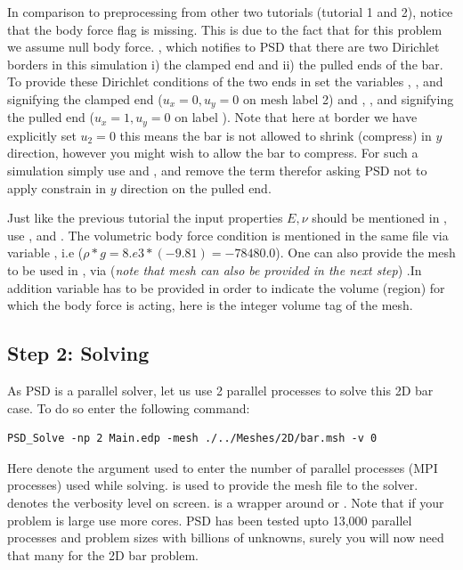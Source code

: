 In comparison to preprocessing from other two tutorials (tutorial 1 and
2), notice that the body force flag  is
missing. This is due to the fact that for this problem we assume null
body force. , which notifies to PSD that
there are two Dirichlet borders in this simulation i) the clamped end
and ii) the pulled ends of the bar. To provide these Dirichlet
conditions of the two ends in  set the
variables , , and 
signifying the clamped end (\(u_x=0,u_y=0\) on mesh label 2) and
, , and  signifying the
pulled end (\(u_x=1,u_y=0\) on label ). Note that here at border
 we have explicitly set \(u_2=0\) this means the bar is not
allowed to shrink (compress) in \(y\) direction, however you might wish
to allow the bar to compress. For such a simulation simply use
 and , and remove the term 
therefor asking PSD not to apply constrain in \(y\) direction on the
pulled end.

Just like the previous tutorial the input properties \(E,\nu\) should be
mentioned in , use , and
. The volumetric body force condition is mentioned in the
same file via variable , i.e
(\(\rho*g=8.e3*(-9.81)=-78480.0\)). One can also provide the mesh to be
used in  , via
(\textit{note that mesh can also be provided in the next step}) .In
addition variable  has to be provided in order to indicate
the volume (region) for which the body force is acting, here  is
the integer volume tag of the mesh.

\subsection{Step 2: Solving}

As PSD is a parallel solver, let us use 2 parallel processes to solve
this 2D bar case. To do so enter the following command:

\begin{lstlisting}[style=BashInputStyle]
PSD_Solve -np 2 Main.edp -mesh ./../Meshes/2D/bar.msh -v 0
\end{lstlisting}

Here  denote the argument used to enter the number of
parallel processes (MPI processes) used while solving.
 is used to provide the mesh file to
the solver.  denotes the verbosity level on screen.
 is a wrapper around  or
. Note that if your problem is large use more cores.
PSD has been tested upto 13,000 parallel processes and problem sizes
with billions of unknowns, surely you will now need that many for the 2D
bar problem.

